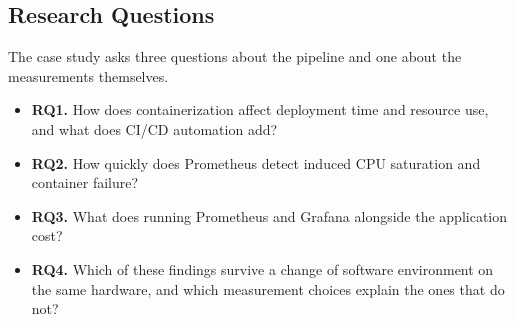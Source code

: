 \documentclass[conference]{IEEEtran}
\begin{document}
\subsection{Research Questions}
The case study asks three questions about the pipeline and one about the
measurements themselves.
\begin{itemize}
\item \textbf{RQ1.} How does containerization affect deployment time and resource
use, and what does CI/CD automation add?
\item \textbf{RQ2.} How quickly does Prometheus detect induced CPU saturation and
container failure?
\item \textbf{RQ3.} What does running Prometheus and Grafana alongside the
application cost?
\item \textbf{RQ4.} Which of these findings survive a change of software
environment on the same hardware, and which measurement choices explain the ones
that do not?
\end{itemize}
\end{document}
